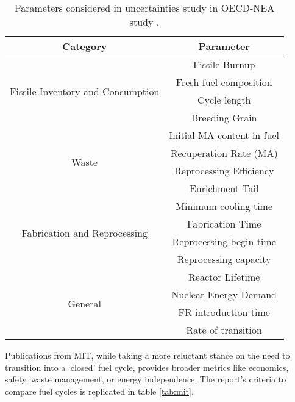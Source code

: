 \begin{table}[h]
    \centering
    \label{tab:sens}
    \caption{Parameters considered in uncertainties study
             in OECD-NEA study \cite{hyland_effects_2015}.}
    \begin{tabular}{cc}
        \hline
        \textbf{Category} & \textbf{Parameter} \\ \hline
        \multirow{4}{*}{Fissile Inventory and Consumption} & Fissile Burnup \\
         & Fresh fuel composition \\
         & Cycle length \\
         & Breeding Grain\\ \hline
        \multirow{4}{*}{Waste} & Initial \gls{MA} content in fuel \\
         & Recuperation Rate (MA) \\
         & Reprocessing Efficiency \\
         & Enrichment Tail \\ \hline
        \multirow{4}{*}{Fabrication and Reprocessing} & Minimum cooling time \\
        & Fabrication Time\\
        & Reprocessing begin time\\
        & Reprocessing capacity\\ \hline
        \multirow{4}{*}{General} & Reactor Lifetime\\
        & Nuclear Energy Demand \\
        & FR introduction time \\
        & Rate of transition \\ \hline
    \end{tabular}
\end{table}

Publications from MIT, while taking a more
reluctant stance on the need to transition into a `closed' fuel cycle,
provides broader metrics like economics,
safety, waste management, or energy independence.
 The report's criteria to compare fuel cycles
is replicated in table \ref{tab:mit}.

